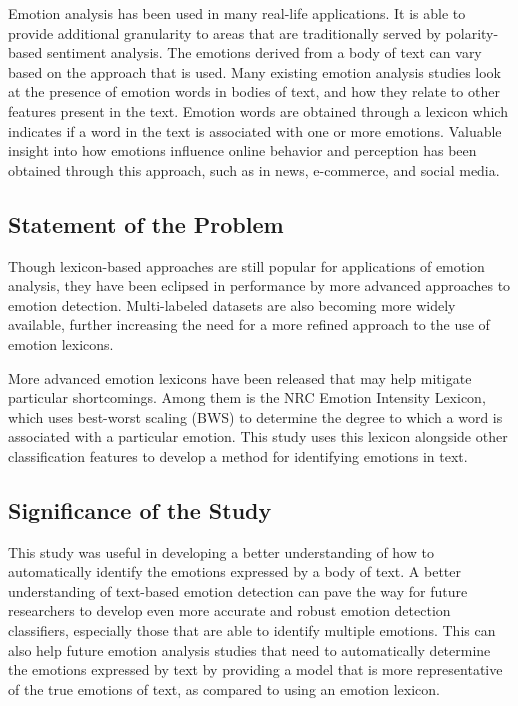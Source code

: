 \documentclass[journal]{./IEEE/IEEEtran}
\begin{document}
Emotion analysis has been used in many real-life applications. It is able to provide additional granularity to areas that are traditionally served by polarity-based sentiment analysis\cite{Kusal1}. The emotions derived from a body of text can vary based on the approach that is used. Many existing emotion analysis studies look at the presence of emotion words in bodies of text, and how they relate to other features present in the text. Emotion words are obtained through a lexicon which indicates if a word in the text is associated with one or more emotions. Valuable insight into how emotions influence online behavior and perception has been obtained through this approach, such as in news\cite{Xu1}, e-commerce\cite{Chatterjee1}, and social media\cite{Chung1}.

\subsection{Statement of the Problem}
Though lexicon-based approaches are still popular for applications of emotion analysis, they have been eclipsed in performance by more advanced approaches to emotion detection. Multi-labeled datasets are also becoming more widely available, further increasing the need for a more refined approach to the use of emotion lexicons.

More advanced emotion lexicons have been released that may help mitigate particular shortcomings. Among them is the NRC Emotion Intensity Lexicon\cite{Mohammad2}, which uses best-worst scaling (BWS) to determine the degree to which a word is associated with a particular emotion. This study uses this lexicon alongside other classification features to develop a method for identifying emotions in text.

\subsection{Significance of the Study}

\pubidadjcol This study was useful in developing a better understanding of how to automatically identify the emotions expressed by a body of text. A better understanding of text-based emotion detection can pave the way for future researchers to develop even more accurate and robust emotion detection classifiers, especially those that are able to identify multiple emotions. This can also help future emotion analysis studies that need to automatically determine the emotions expressed by text by providing a model that is more representative of the true emotions of text, as compared to using an emotion lexicon.
\end{document}

